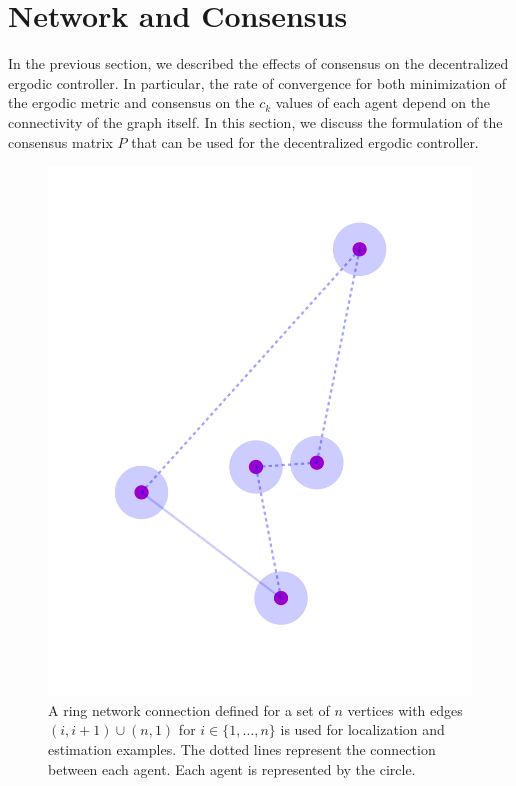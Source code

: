 \documentclass[letterpaper, 10 pt,  conference, twoside]{IEEEtran/IEEEtran}
\theoremstyle{definition}
\begin{document}
\section{Network and Consensus} \label{sec:network}

In the previous section, we described the effects of consensus on the decentralized ergodic controller. In particular, the rate of convergence for both minimization of the ergodic metric and consensus on the $c_k$ values of each agent depend on the connectivity of the graph itself. In this section, we discuss the formulation of the consensus matrix $P$ that can be used for the decentralized ergodic controller.

\begin{figure}[th]
\centering
\includegraphics[scale=0.4]{figures/5networkpath.png}
\caption{ A ring network connection defined for a set of $n$ vertices with edges $(i,i+1) \cup (n,1)$ for $i \in \{1, \ldots, n\}$ is used for localization and estimation examples. The dotted lines represent the connection between each agent. Each agent is represented by the circle. }
\label{fig:path}
\end{figure}
\end{document}
